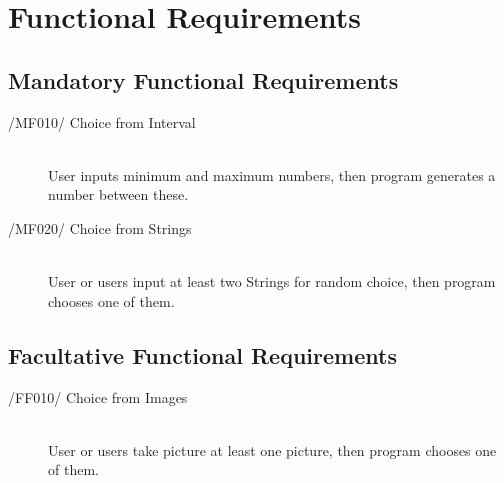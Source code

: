 \newpage
\section{Functional Requirements}

\subsection{Mandatory Functional Requirements}
\begin{description}
\item[/MF010/ Choice from Interval]\hfill \\ User inputs minimum and maximum numbers, then program generates a number between these.
\item[/MF020/ Choice from Strings]\hfill \\ User or users input at least two Strings for random choice, then program chooses one of them.

\end{description}

\subsection{Facultative Functional Requirements}
\begin{description}
\item[/FF010/ Choice from Images]\hfill \\ User or users take picture at least one picture, then program chooses one of them.
\end{description}